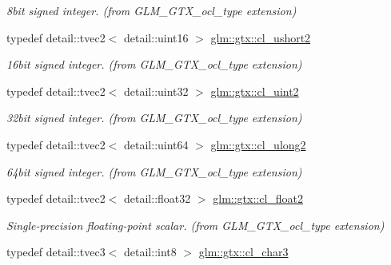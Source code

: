 \begin{DoxyCompactItemize}
\begin{DoxyCompactList}\small\item\em 8bit signed integer. (from G\+L\+M\+\_\+\+G\+T\+X\+\_\+ocl\+\_\+type extension) \end{DoxyCompactList}\item 
\hypertarget{group__gtx__ocl__type_ga5a3a3148578e3fa3523fbebe56dee20a}{}typedef detail\+::tvec2$<$ detail\+::uint16 $>$ \hyperlink{group__gtx__ocl__type_ga5a3a3148578e3fa3523fbebe56dee20a}{glm\+::gtx\+::cl\+\_\+ushort2}\label{group__gtx__ocl__type_ga5a3a3148578e3fa3523fbebe56dee20a}

\begin{DoxyCompactList}\small\item\em 16bit signed integer. (from G\+L\+M\+\_\+\+G\+T\+X\+\_\+ocl\+\_\+type extension) \end{DoxyCompactList}\item 
\hypertarget{group__gtx__ocl__type_ga22ce60d772ace0ded8c266ac67090645}{}typedef detail\+::tvec2$<$ detail\+::uint32 $>$ \hyperlink{group__gtx__ocl__type_ga22ce60d772ace0ded8c266ac67090645}{glm\+::gtx\+::cl\+\_\+uint2}\label{group__gtx__ocl__type_ga22ce60d772ace0ded8c266ac67090645}

\begin{DoxyCompactList}\small\item\em 32bit signed integer. (from G\+L\+M\+\_\+\+G\+T\+X\+\_\+ocl\+\_\+type extension) \end{DoxyCompactList}\item 
\hypertarget{group__gtx__ocl__type_ga88b54ee2b21f524e53a4c04b84f46562}{}typedef detail\+::tvec2$<$ detail\+::uint64 $>$ \hyperlink{group__gtx__ocl__type_ga88b54ee2b21f524e53a4c04b84f46562}{glm\+::gtx\+::cl\+\_\+ulong2}\label{group__gtx__ocl__type_ga88b54ee2b21f524e53a4c04b84f46562}

\begin{DoxyCompactList}\small\item\em 64bit signed integer. (from G\+L\+M\+\_\+\+G\+T\+X\+\_\+ocl\+\_\+type extension) \end{DoxyCompactList}\item 
\hypertarget{group__gtx__ocl__type_gaf6b96a355a94588f03437b85d6a0b797}{}typedef detail\+::tvec2$<$ detail\+::float32 $>$ \hyperlink{group__gtx__ocl__type_gaf6b96a355a94588f03437b85d6a0b797}{glm\+::gtx\+::cl\+\_\+float2}\label{group__gtx__ocl__type_gaf6b96a355a94588f03437b85d6a0b797}

\begin{DoxyCompactList}\small\item\em Single-\/precision floating-\/point scalar. (from G\+L\+M\+\_\+\+G\+T\+X\+\_\+ocl\+\_\+type extension) \end{DoxyCompactList}\item 
\hypertarget{group__gtx__ocl__type_ga1a510f4845e7745f42f53b828d9006fc}{}typedef detail\+::tvec3$<$ detail\+::int8 $>$ \hyperlink{group__gtx__ocl__type_ga1a510f4845e7745f42f53b828d9006fc}{glm\+::gtx\+::cl\+\_\+char3}\label{group__gtx__ocl__type_ga1a510f4845e7745f42f53b828d9006fc}


\end{DoxyCompactItemize}
